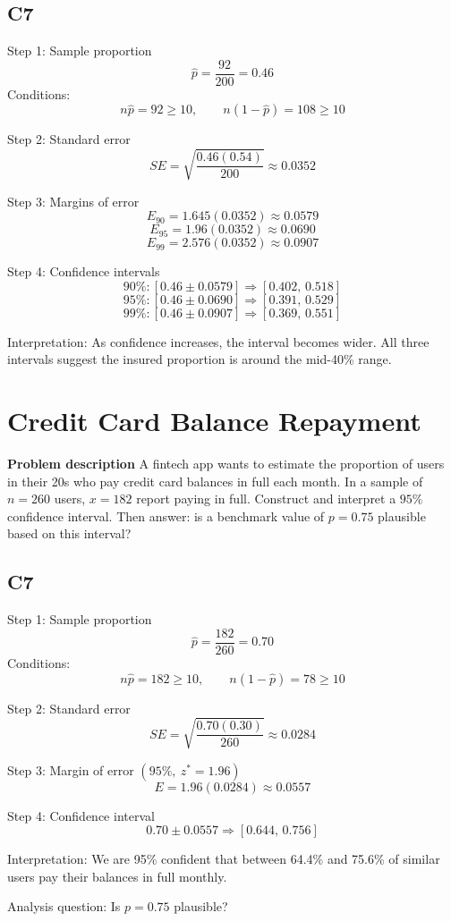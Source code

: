 	\subsection*{C7}
	Step 1: Sample proportion
	\[
	\hat p=\frac{92}{200}=0.46
	\]
	Conditions:
	\[
	n\hat p=92\ge 10,\qquad n(1-\hat p)=108\ge 10
	\]
	
	Step 2: Standard error
	\[
	SE=\sqrt{\frac{0.46(0.54)}{200}}\approx 0.0352
	\]
	
	Step 3: Margins of error
	\[
	E_{90}=1.645(0.0352)\approx 0.0579
	\]
	\[
	E_{95}=1.96(0.0352)\approx 0.0690
	\]
	\[
	E_{99}=2.576(0.0352)\approx 0.0907
	\]
	
	Step 4: Confidence intervals
	\[
	90\%:[0.46\pm 0.0579]\Rightarrow [0.402,\,0.518]
	\]
	\[
	95\%:[0.46\pm 0.0690]\Rightarrow [0.391,\,0.529]
	\]
	\[
	99\%:[0.46\pm 0.0907]\Rightarrow [0.369,\,0.551]
	\]
	
	Interpretation: As confidence increases, the interval becomes wider. All three intervals suggest the insured proportion is around the mid-40\% range.
	
	\section{Credit Card Balance Repayment}
	\textbf{Problem description}
	A fintech app wants to estimate the proportion of users in their 20s who pay credit card balances in full each month. In a sample of \(n=260\) users, \(x=182\) report paying in full. Construct and interpret a \(95\%\) confidence interval. Then answer: is a benchmark value of \(p=0.75\) plausible based on this interval?
	
	\subsection*{C7}
	Step 1: Sample proportion
	\[
	\hat p=\frac{182}{260}=0.70
	\]
	Conditions:
	\[
	n\hat p=182\ge 10,\qquad n(1-\hat p)=78\ge 10
	\]
	
	Step 2: Standard error
	\[
	SE=\sqrt{\frac{0.70(0.30)}{260}}\approx 0.0284
	\]
	
	Step 3: Margin of error \((95\%,\ z^*=1.96)\)
	\[
	E=1.96(0.0284)\approx 0.0557
	\]
	
	Step 4: Confidence interval
	\[
	0.70\pm 0.0557\Rightarrow [0.644,\,0.756]
	\]
	
	Interpretation: We are 95\% confident that between 64.4\% and 75.6\% of similar users pay their balances in full monthly.
	
	Analysis question: Is \(p=0.75\) plausible?
	
